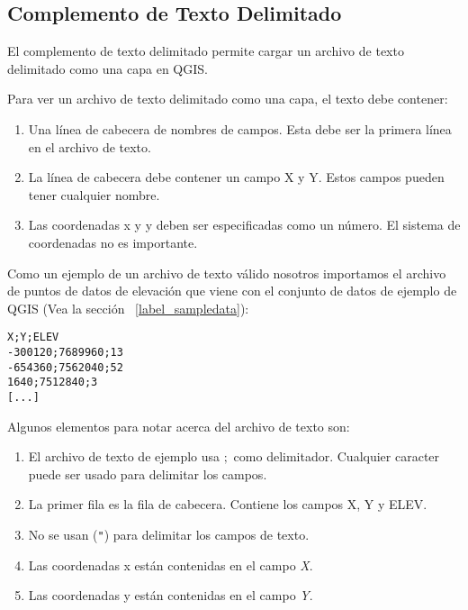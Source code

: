 
\subsection{Complemento de Texto Delimitado}\label{label_dltext}    


El complemento de texto delimitado permite cargar un archivo de texto delimitado como una capa en QGIS. 


Para ver un archivo de texto delimitado como una capa, el texto debe contener:

\begin{enumerate}      
\item Una línea de cabecera de nombres de campos. Esta debe ser la primera línea en el archivo de texto.
\item La línea de cabecera debe contener un campo X y Y. Estos campos pueden tener cualquier nombre.
\item Las coordenadas x y y deben ser especificadas como un número. El sistema de coordenadas no es importante.
\end{enumerate}

Como un ejemplo de un archivo de texto válido nosotros importamos el archivo de puntos de datos de elevación 
 que viene con el conjunto de datos de ejemplo de QGIS (Vea la sección ~\ref{label_sampledata}):

\begin{verbatim} 
X;Y;ELEV
-300120;7689960;13
-654360;7562040;52
1640;7512840;3
[...]
\end{verbatim}

Algunos elementos para notar acerca del archivo de texto son:

\begin{enumerate}
\item El archivo de texto de ejemplo usa \mbox{$;$} como delimitador. Cualquier caracter puede ser usado para delimitar los campos.
\item La primer fila es la fila de cabecera. Contiene los campos X, Y y ELEV.
\item No se usan ({\tt{}"{}}) para delimitar los campos de texto.
\item Las coordenadas x están contenidas en el campo {\em X}.
\item Las coordenadas y están contenidas en el campo {\em Y}.
\end{enumerate}

